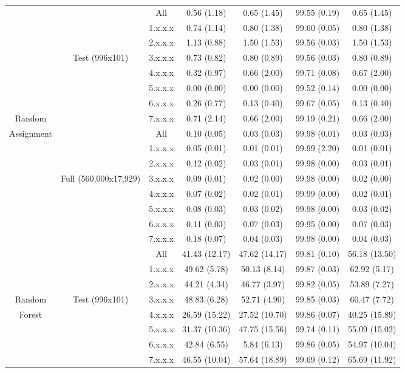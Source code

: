 \documentclass[12pt]{article}
\begin{document}
\begin{landscape}
\begin{tabular}{|c|c||c||c|c|c|c|}
			\hline
			&&All&0.56 (1.18)&0.65 (1.45)&99.55 (0.19)&0.65 (1.45)\\
			\cline{3-7}
			&&1.x.x.x&0.74 (1.14)&0.80 (1.38)&99.60 (0.05)&0.80 (1.38)\\
			\cline{3-7}
			&&2.x.x.x&1.13 (0.88)&1.50 (1.53)&99.56 (0.03)&1.50 (1.53)\\
			\cline{3-7}
			&Test (996x101)&3.x.x.x&0.73 (0.82)&0.80 (0.89)&99.56 (0.03)&0.80 (0.89)\\
			\cline{3-7}
			&&4.x.x.x&0.32 (0.97)&0.66 (2.00)&99.71 (0.08)&0.67 (2.00)\\
			\cline{3-7}
			&&5.x.x.x&0.00 (0.00)&0.00 (0.00)&99.52 (0.14)&0.00 (0.00)\\
			\cline{3-7}
			&&6.x.x.x&0.26 (0.77)&0.13 (0.40)&99.67 (0.05)&0.13 (0.40)\\
			\cline{3-7}
			Random&&7.x.x.x&0.71 (2.14)&0.66 (2.00)&99.19 (0.21)&0.66 (2.00)\\
			\cline{2-7}
			Assignment&&All&0.10 (0.05)&0.03 (0.03)&99.98 (0.01)&0.03 (0.03)\\
			\cline{3-7}
			&&1.x.x.x&0.05 (0.01)&0.01 (0.01)&99.99 (2.20)&0.01 (0.01)\\
			\cline{3-7}
			&&2.x.x.x&0.12 (0.02)&0.03 (0.01)&99.98 (0.00)&0.03 (0.01)\\
			\cline{3-7}
			&Full (560,000x17,929)&3.x.x.x&0.09 (0.01)&0.02 (0.00)&99.98 (0.00)&0.02 (0.00)\\
			\cline{3-7}
			&&4.x.x.x&0.07 (0.02)&0.02 (0.01)&99.99 (0.00)&0.02 (0.01)\\
			\cline{3-7}
			&&5.x.x.x&0.08 (0.03)&0.03 (0.02)&99.98 (0.00)&0.03 (0.02)\\
			\cline{3-7}
			&&6.x.x.x&0.11 (0.03)&0.07 (0.03)&99.95 (0.00)&0.07 (0.03)\\
			\cline{3-7}
			&&7.x.x.x&0.18 (0.07)&0.04 (0.03)&99.98 (0.00)&0.04 (0.03)\\
			\hline
			\hline
			&&All&41.43 (12.17)&47.62 (14.17)&99.81 (0.10)&56.18 (13.50)\\
			\cline{3-7}
			&&1.x.x.x&49.62 (5.78)&50.13 (8.14)&99.87 (0.03)&62.92 (5.17)\\
			\cline{3-7}
			&&2.x.x.x&44.21 (4.34)&46.77 (3.97)&99.82 (0.05)&53.89 (7.27)\\
			\cline{3-7}
			Random&Test (996x101)&3.x.x.x&48.83 (6.28)&52.71 (4.90)&99.85 (0.03)&60.47 (7.72)\\
			\cline{3-7}
			Forest&&4.x.x.x&26.59 (15.22)&27.52 (10.70)&99.86 (0.07)&40.25 (15.89)\\
			\cline{3-7}
			&&5.x.x.x&31.37 (10.36)&47.75 (15.56)&99.74 (0.11)&55.09 (15.02)\\
			\cline{3-7}
			&&6.x.x.x&42.84 (6.55)&5.84 (6.13)&99.86 (0.05)&54.97 (10.04)\\
			\cline{3-7}
			&&7.x.x.x&46.55 (10.04)&57.64 (18.89)&99.69 (0.12)&65.69 (11.92)\\
			\hline
			
			
		\end{tabular}
		\end{landscape}
		
\end{document}
